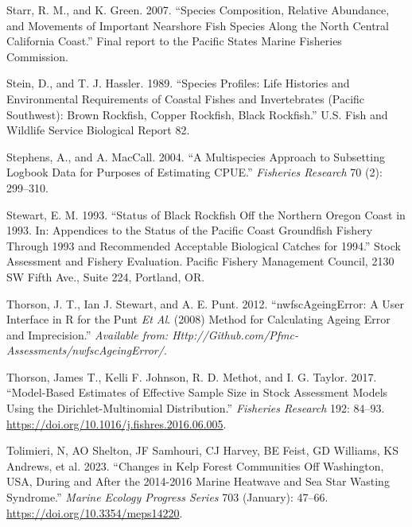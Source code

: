 \documentclass[11pt,
  english,
  letterpaper,
]{article}
\newlength{\cslhangindent}
\newenvironment{CSLReferences}[2] %
 {%
  \setlength{\parindent}{0pt}
  \ifodd #1 \everypar{\setlength{\hangindent}{\cslhangindent}}\ignorespaces\fi
  \ifnum #2 > 0
  \setlength{\parskip}{#2\baselineskip}
  \fi
 }%
 {}
\begin{document}
\begin{CSLReferences}{1}{0}
\leavevmode{}%
Starr, R. M., and K. Green. 2007. {``Species Composition, Relative Abundance, and Movements of Important Nearshore Fish Species Along the North Central California Coast.''} Final report to the Pacific States Marine Fisheries Commission.

\leavevmode{}%
Stein, D., and T. J. Hassler. 1989. {``Species Profiles: Life Histories and Environmental Requirements of Coastal Fishes and Invertebrates (Pacific Southwest): Brown Rockfish, Copper Rockfish, Black Rockfish.''} U.S. Fish and Wildlife Service Biological Report 82.

\leavevmode{}%
Stephens, A., and A. MacCall. 2004. {``A Multispecies Approach to Subsetting Logbook Data for Purposes of Estimating {CPUE}.''} \emph{Fisheries Research} 70 (2): 299--310.

\leavevmode{}%
Stewart, E. M. 1993. {``Status of Black Rockfish Off the Northern Oregon Coast in 1993. In: Appendices to the Status of the Pacific Coast Groundfish Fishery Through 1993 and Recommended Acceptable Biological Catches for 1994.''} Stock Assessment and Fishery Evaluation. Pacific Fishery Management Council, 2130 SW Fifth Ave., Suite 224, Portland, OR.

\leavevmode{}%
Thorson, J. T., Ian J. Stewart, and A. E. Punt. 2012. {``{nwfscAgeingError}: A User Interface in {R} for the {P}unt \emph{Et Al}. (2008) Method for Calculating Ageing Error and Imprecision.''} \emph{Available from: Http://Github.com/Pfmc-Assessments/nwfscAgeingError/}.

\leavevmode{}%
Thorson, James T., Kelli F. Johnson, R. D. Methot, and I. G. Taylor. 2017. {``Model-Based Estimates of Effective Sample Size in Stock Assessment Models Using the {Dirichlet}-Multinomial Distribution.''} \emph{Fisheries Research} 192: 84--93. \url{https://doi.org/10.1016/j.fishres.2016.06.005}.

\leavevmode{}%
Tolimieri, N, AO Shelton, JF Samhouri, CJ Harvey, BE Feist, GD Williams, KS Andrews, et al. 2023. {``Changes in Kelp Forest Communities Off Washington, {USA}, During and After the 2014-2016 Marine Heatwave and Sea Star Wasting Syndrome.''} \emph{Marine Ecology Progress Series} 703 (January): 47--66. \url{https://doi.org/10.3354/meps14220}.


\end{CSLReferences}
\end{document}
